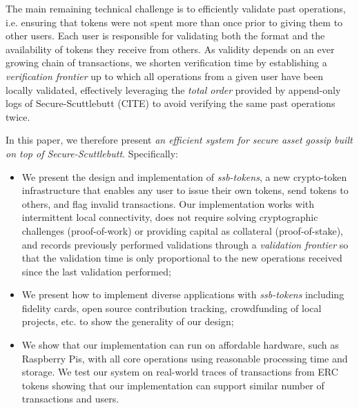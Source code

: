 \documentclass[sigplan,screen,10pt]{acmart}
\begin{document}
The main remaining technical challenge is to efficiently validate past operations, i.e. ensuring that tokens were not spent more than once prior to giving them to other users. Each user is responsible for validating both the format and the availability of tokens they receive from others. 
As validity depends on an ever growing chain of transactions, we shorten verification time by establishing a \textit{verification frontier} up to which all operations from a given user have been locally validated, effectively leveraging the \textit{total order} provided by append-only logs of Secure-Scuttlebutt (CITE) to avoid verifying the same past operations twice.


In this paper, we therefore present \textit{an efficient system for secure asset gossip built on top of Secure-Scuttlebutt}. Specifically:
\begin{itemize}
 \item We present the design and implementation of \textit{ssb-tokens}, a new crypto-token infrastructure that enables any user to issue their own tokens, send tokens to others, and flag invalid transactions. Our implementation works with intermittent local connectivity, does not require solving cryptographic challenges (proof-of-work) or providing capital as collateral (proof-of-stake), and records previously performed validations through a \textit{validation frontier} so that the validation time is only proportional to the new operations received since the last validation performed;
 \item  We present how to implement diverse applications with \textit{ssb-tokens} including fidelity cards, open source contribution tracking, crowdfunding of local projects, etc. to show the generality of our design;
 \item We show that our implementation can run on affordable hardware, such as Raspberry Pis, with all core operations using reasonable processing time and storage. We test our system on real-world traces of transactions from ERC tokens showing that our implementation can support similar number of transactions and users.
\end{itemize}
\end{document}
